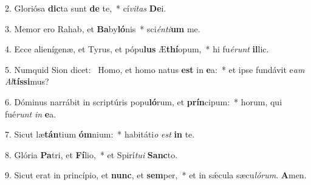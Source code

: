 2. Gloriósa \textbf{dic}ta sunt \textbf{de} te,~*  cí\textit{vi}\textit{tas} \textbf{De}i.\

3. Memor ero Rahab, et \textbf{Ba}by\textbf{ló}nis~*  sci\textit{én}\textit{ti}\textbf{um} me.\

4. Ecce alienígenæ, et Tyrus, et pópu\textbf{lus} Æ\textbf{thí}opum,~*  hi fu\textit{é}\textit{runt} \textbf{il}lic.\

5. Numquid Sion dicet: \dag\  Homo, et homo natus \textbf{est} in \textbf{e}a:~*  et ipse fundávit e\textit{am} \textit{Al}\textbf{tís}\textbf{si}mus?\

6. Dóminus narrábit in scriptúris popu\textbf{ló}rum, et \textbf{prín}cipum:~*  horum, qui fué\textit{runt} \textit{in} \textbf{e}a.\

7. Sicut læ\textbf{tán}tium \textbf{óm}nium:~*  habitáti\textit{o} \textit{est} \textbf{in} te.\

8. Glória \textbf{Pa}tri, et \textbf{Fí}lio,~*  et Spirí\textit{tu}\textit{i} \textbf{Sanc}to.\

9. Sicut erat in princípio, et \textbf{nunc}, et \textbf{sem}per,~*  et in sǽcula sæcu\textit{ló}\textit{rum}. \textbf{A}men.\

